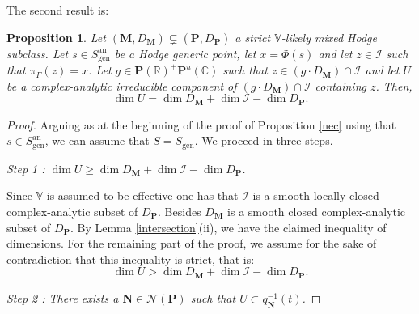 \documentclass[10pt]{article}
\numberwithin{equation}{subsection}
\theoremstyle{plain}
\newtheorem{proposition}[theorem]{Proposition}
\theoremstyle{definition}
\theoremstyle{remark}
\newcommand{\I}{\mathscr{I}}
\newcommand{\C}{\mathbb C}
\newcommand{\R}{\mathbb R}
\newcommand{\V}{\mathbb V}
\newcommand{\pp}{\mathbf P}
\newcommand{\M}{\mathbf M}
\newcommand{\NN}{\mathbf N}
\newcommand{\an}{\mathrm{an}}
\newcommand{\Np}{\mathcal{N}(\pp)}
\newcommand{\gen}{\mathrm{gen}}
\begin{document}
The second result is:
\begin{proposition}\label{suf}
Let $(\M, D_\M)\subsetneq (\pp,D_\pp)$ a strict $\V$-likely mixed Hodge subclass. Let $s \in S_\gen^\an$ be a Hodge generic point, let $x = \Phi(s)$ and let $z \in \I$ such that $\pi_\Gamma(z) = x$. Let $g \in \pp(\R)^+\pp^u(\C)$ such that $z \in (g \cdot D_\M) \cap \I$ and let $U$ be a complex-analytic irreducible component of $(g \cdot D_\M) \cap \I$ containing $z$. Then,
\[
\dim U = \dim D_\M + \dim \I - \dim D_\pp.
\]
\end{proposition}
\begin{proof}
Arguing as at the beginning of the proof of Proposition \ref{nec} using that $s \in S_\gen^\an$, we can assume that $S = S_\gen$. We proceed in three steps.

\noindent \textit{Step 1 : $\dim U \geqslant \dim D_\M + \dim \I - \dim D_\pp$.}

Since $\V$ is assumed to be effective one has that $\I$ is a smooth locally closed complex-analytic subset of $D_\pp$. Besides $D_\M$ is a smooth closed complex-analytic subset of $D_\pp$. By Lemma \ref{intersection}(ii), we have the claimed inequality of dimensions. For the remaining part of the proof, we assume for the sake of contradiction that this inequality is strict, that is:
\[
\dim U > \dim D_\M + \dim \I - \dim D_\pp.
\]

\noindent \textit{Step 2 : There exists a $\NN \in \Np$ such that $U \subset q_\NN^{-1}(t)$.}


\end{proof}
\end{document}

